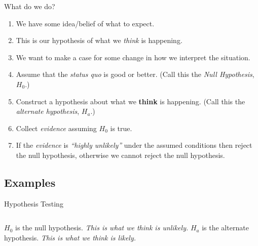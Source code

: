 \begin{frame}{What do we do?}

  \begin{enumerate}
  \item<1-> We have some {\color{red}idea/belief} of what to expect.
  \item<2-> This is our {\color{red}hypothesis} of what we \textit{think} is happening.
  \item<3-> We want to {\color{red}make a case} for some change in how we interpret the
    situation.
  \item<4-> {\color{red}Assume} that the \textit{status quo} is good or better. (Call this the
    \textit{Null Hypothesis}, $H_0$.)
  \item<5-> {\color{red}Construct a hypothesis} about what we \textbf{think}
    is happening. (Call this the \textit{alternate hypothesis}, $H_a$.)
  \item<6-> Collect \textit{evidence} {\color{red}assuming $H_0$ is true}. 
  \item<7-> If the \textit{evidence} is {\color{red}\textit{``highly
        unlikely''} under the assumed conditions} then reject the null
    hypothesis, otherwise we cannot reject the null hypothesis.
  \end{enumerate}
  
\end{frame}

\subsection{Examples}

\begin{frame}{Hypothesis Testing}

  \begin{columns}
    $H_0$ is the null hypothesis.
    \vfill
    \textit{This is what we think is unlikely.}
    $H_a$ is the alternate hypothesis.
    \vfill
    \textit{This is what we think is likely.}
  \end{columns}
\end{frame}


